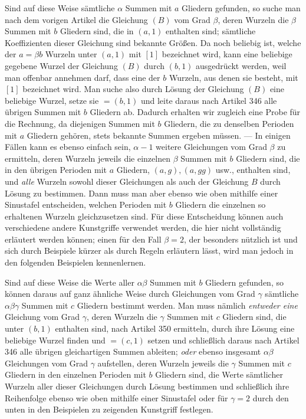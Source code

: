 Sind auf diese Weise sämtliche \(\alpha\) Summen mit \(a\) Gliedern gefunden, so suche man nach dem vorigen Artikel die Gleichung \((B)\) vom Grad \(\beta\), deren Wurzeln die \(\beta\) Summen mit \(b\) Gliedern sind, die in \((a,1)\) enthalten sind; sämtliche Koeffizienten dieser Gleichung sind bekannte
Größen. Da noch beliebig ist, welche der \(a=\beta b\) Wurzeln unter \((a,1)\) mit \([1]\) bezeichnet wird, kann eine beliebige gegebene Wurzel der Gleichung \((B)\) durch \((b,1)\) ausgedrückt werden, weil man offenbar annehmen darf, dass eine der \(b\) Wurzeln, aus denen sie besteht, mit \([1]\) bezeichnet wird. Man suche also durch Lösung der Gleichung \((B)\) eine beliebige Wurzel, setze sie \(=(b,1)\) und leite daraus nach Artikel 346 alle übrigen Summen mit \(b\) Gliedern ab. Dadurch erhalten wir zugleich eine Probe für die Rechnung, da diejenigen Summen mit \(b\) Gliedern, die zu denselben Perioden mit \(a\) Gliedern gehören, stets bekannte Summen ergeben müssen. — In einigen Fällen kann es ebenso einfach sein, \(\alpha-1\) weitere Gleichungen vom Grad \(\beta\) zu ermitteln, deren Wurzeln jeweils die einzelnen \(\beta\) Summen mit \(b\) Gliedern sind, die in den übrigen Perioden mit \(a\) Gliedern, \((a,g),\allowbreak (a,gg)\) usw., enthalten sind, und \textit{alle} Wurzeln sowohl dieser Gleichungen als auch der Gleichung \(B\) durch Lösung zu bestimmen. Dann muss man aber ebenso wie oben mithilfe einer Sinustafel entscheiden, welchen Perioden mit \(b\) Gliedern die einzelnen so erhaltenen Wurzeln gleichzusetzen sind. Für diese Entscheidung können auch verschiedene andere Kunstgriffe verwendet werden, die hier nicht vollständig erläutert werden können; einen für den Fall \(\beta=2\), der besonders nützlich ist und sich durch Beispiele kürzer als durch Regeln erläutern lässt, wird man jedoch in den folgenden Beispielen kennenlernen.

Sind auf diese Weise die Werte aller \(\alpha\beta\) Summen mit \(b\) Gliedern gefunden, so können daraus auf ganz ähnliche Weise durch Gleichungen vom Grad \(\gamma\) sämtliche \(\alpha\beta\gamma\) Summen mit \(c\) Gliedern bestimmt werden. Man muss nämlich \textit{entweder eine} Gleichung vom Grad \(\gamma\), deren Wurzeln die \(\gamma\) Summen mit \(c\) Gliedern sind, die unter \((b,1)\) enthalten sind, nach Artikel 350 ermitteln, durch ihre Lösung eine beliebige Wurzel finden und \(=(c,1)\) setzen und schließlich daraus nach Artikel 346 alle übrigen gleichartigen Summen ableiten; \textit{oder} ebenso insgesamt \(\alpha\beta\) Gleichungen vom Grad \(\gamma\) aufstellen, deren Wurzeln jeweils die \(\gamma\) Summen mit \(c\) Gliedern in den einzelnen Perioden mit \(b\) Gliedern sind, die Werte sämtlicher Wurzeln aller dieser Gleichungen durch Lösung bestimmen und schließlich ihre Reihenfolge ebenso wie oben mithilfe einer Sinustafel oder für \(\gamma=2\) durch den unten in den Beispielen zu zeigenden Kunstgriff festlegen.

